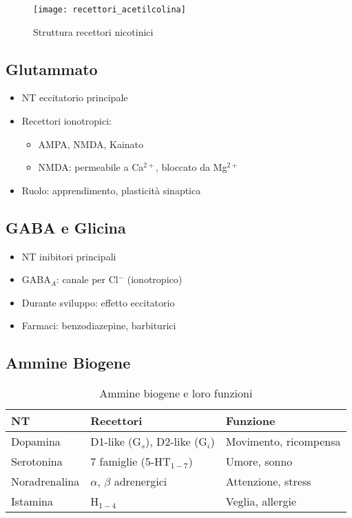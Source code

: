 \documentclass[12pt]{article}
\begin{document}
\begin{figure}[h]
    \centering
    \texttt{[image: recettori\_acetilcolina]}
    \caption{Struttura recettori nicotinici}
\end{figure}

\subsection{Glutammato}
\begin{itemize}
    \item NT eccitatorio principale
    \item Recettori ionotropici:
    \begin{itemize}
        \item AMPA, NMDA, Kainato
        \item NMDA: permeabile a Ca$^{2+}$, bloccato da Mg$^{2+}$
    \end{itemize}
    \item Ruolo: apprendimento, plasticità sinaptica
\end{itemize}

\subsection{GABA e Glicina}
\begin{itemize}
    \item NT inibitori principali
    \item GABA$_A$: canale per Cl$^-$ (ionotropico)
    \item Durante sviluppo: effetto eccitatorio
    \item Farmaci: benzodiazepine, barbiturici
\end{itemize}

\subsection{Ammine Biogene}
\begin{table}[h]
    \centering
    \begin{tabular}{lll}
        \toprule
        \textbf{NT} & \textbf{Recettori} & \textbf{Funzione} \\
        \midrule
        Dopamina & D1-like (G$_s$), D2-like (G$_i$) & Movimento, ricompensa \\
        Serotonina & 7 famiglie (5-HT$_{1-7}$) & Umore, sonno \\
        Noradrenalina & $\alpha$, $\beta$ adrenergici & Attenzione, stress \\
        Istamina & H$_{1-4}$ & Veglia, allergie \\
        \bottomrule
    \end{tabular}
    \caption{Ammine biogene e loro funzioni}
\end{table}
\end{document}
